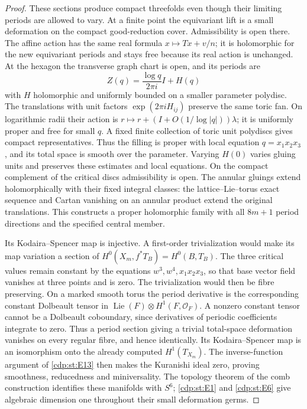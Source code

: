 \begin{proof}
These sections produce compact threefolds even though their
limiting periods are allowed to vary. At a finite point the
equivariant lift is a small deformation on the compact
good-reduction cover. Admissibility is open there. The affine
action has the same real formula $x\mapsto Tx+v/n$; it is
holomorphic for the new equivariant periods and stays free
because its real action is unchanged. At the hexagon the
transverse graph chart is open, and its periods are
\[
 Z(q)=\frac{\log q}{2\pi i}I+H(q)
\]
with $H$ holomorphic and uniformly bounded on a smaller parameter
polydisc. The translations with unit factors
$\exp(2\pi iH_{ij})$ preserve the same toric fan. On logarithmic
radii their action is
$r\mapsto r+(I+O(1/\log|q|))\lambda$; it is uniformly proper
and free for small $q$. A fixed finite collection of toric unit
polydiscs gives compact representatives. Thus the filling is
proper with local equation $q=x_1x_2x_3$, and its total space
is smooth over the parameter. Varying $H(0)$ varies gluing units
and preserves these estimates and local equations. On the
compact complement of the critical discs admissibility is open.
The annular gluings extend holomorphically with their fixed
integral classes: the lattice--Lie--torus exact sequence and
Cartan vanishing on an annular product extend the original
translations. This constructs a proper holomorphic family with
all $8m+1$ period directions and the specified central member.

Its Kodaira--Spencer map is injective. A first-order trivialization
would make its map variation a section of
$H^0(X_m,f^*T_B)=H^0(B,T_B)$. The three critical values remain
constant by the equations $w^3,w^4,x_1x_2x_3$, so that base
vector field vanishes at three points and is zero. The
trivialization would then be fibre preserving. On a marked
smooth torus the period derivative is the corresponding
constant Dolbeault tensor in
$\operatorname{Lie}(F)\otimes H^1(F,\mathcal O_F)$.
A nonzero constant tensor cannot be a Dolbeault coboundary,
since derivatives of periodic coefficients integrate to zero.
Thus a period section giving a trivial total-space deformation
vanishes on every regular fibre, and hence identically. Its
Kodaira--Spencer map is an isomorphism onto the already computed
$H^1(T_{X_m})$. The inverse-function argument of \ref{cdp:st:E13} then makes
the Kuranishi ideal zero, proving smoothness, reducedness and
miniversality. The topology theorem of the comb construction
identifies these manifolds with $S^6$; \ref{cdp:st:E1} and \ref{cdp:st:E6} give algebraic
dimension one throughout their small deformation germs.
\end{proof}

